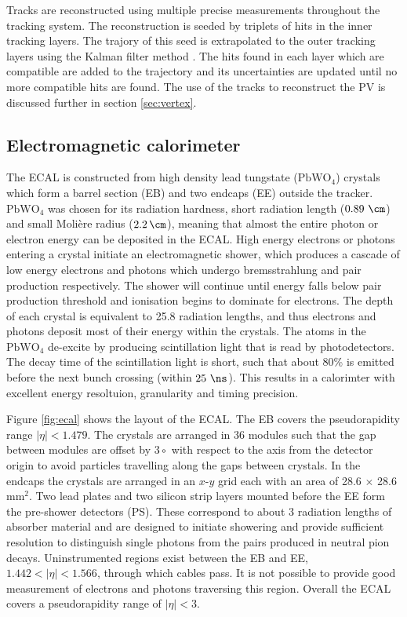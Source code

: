 Tracks are reconstructed using multiple precise measurements throughout the
tracking system. The reconstruction is seeded by triplets of hits in the inner
tracking layers. The trajory of this seed is extrapolated to the outer tracking
layers using the Kalman filter method \cite{}. The hits found in each layer
which are compatible are added to the trajectory and its uncertainties are
updated until no more compatible hits are found. The use of the tracks to
reconstruct the \ac{PV} is discussed further in section \ref{sec:vertex}.

\subsection{Electromagnetic calorimeter}
\label{sec:ecal}

The \ac{ECAL} is constructed from high density lead tungstate
($\mathrm{PbWO_{4}}$) crystals which form a barrel section (EB) 
and two endcaps (EE) outside the tracker. $\mathrm{PbWO_{4}}$ was chosen for its
radiation hardness, short radiation length ($0.89~\cm$) and small Moli\`ere
radius ($2.2\,\cm$), meaning that almost the entire photon or electron energy
can be deposited in the \ac{ECAL}. High energy electrons or photons
entering a crystal initiate an electromagnetic shower, which produces a cascade
of low energy electrons and photons which undergo bremsstrahlung and pair
production respectively. The shower will continue until energy falls below pair
production threshold and ionisation begins to dominate for electrons. 
The depth of each crystal is equivalent to 25.8 radiation lengths, and
thus electrons and photons deposit most of their energy within the crystals.
The atoms in the $\mathrm{PbWO_{4}}$ de-excite by producing scintillation light that is read by
photodetectors. The decay time of the scintillation light is short, such that
about 80\% is emitted before the next bunch crossing (within $25~\ns$). This
results in a calorimter with excellent energy resoltuion, granularity and timing
precision.

Figure \ref{fig:ecal} shows the layout of the \ac{ECAL}. The EB covers the
pseudorapidity range $|\eta|<1.479$. The crystals are arranged in 36 modules such
that the gap between modules are offset by $3\circ$ with respect to the axis
from the detector origin to avoid particles travelling along the gaps between
crystals. In
the endcaps the crystals are arranged in an $x$-$y$ grid each with an area of
28.6$\,\times\,$28.6 $\mathrm{mm^{2}}$. Two lead plates and two silicon strip
layers mounted before the EE form the pre-shower detectors (PS). These correspond to about
$3$ radiation lengths of absorber material and are designed to initiate
showering and provide sufficient resolution to distinguish single photons from
the pairs produced in neutral pion decays. Uninstrumented regions exist
between the EB and EE, $1.442 < |\eta| < 1.566$, through which cables pass. It
is not possible to provide good measurement of electrons and photons traversing
this region. Overall the \ac{ECAL} covers a pseudorapidity range of $|\eta|<3$.


